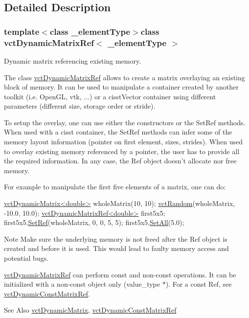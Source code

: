 \subsection{Detailed Description}
\subsubsection*{template$<$class \-\_\-element\-Type$>$class vct\-Dynamic\-Matrix\-Ref$<$ \-\_\-element\-Type $>$}

Dynamic matrix referencing existing memory. 

The class \hyperlink{classvct_dynamic_matrix_ref}{vct\-Dynamic\-Matrix\-Ref} allows to create a matrix overlaying an existing block of memory. It can be used to manipulate a container created by another toolkit (i.\-e. Open\-G\-L, vtk, ...) or a cisst\-Vector container using different parameters (different size, storage order or stride).

To setup the overlay, one can use either the constructors or the Set\-Ref methods. When used with a cisst container, the Set\-Ref methods can infer some of the memory layout information (pointer on first element, sizes, strides). When used to overlay existing memory referenced by a pointer, the user has to provide all the required information. In any case, the Ref object doesn't allocate nor free memory.

For example to manipulate the first five elements of a matrix, one can do\-: 
\begin{DoxyCode}
\hyperlink{classvct_dynamic_matrix}{vctDynamicMatrix<double>} wholeMatrix(10, 10);
\hyperlink{group__cisst_vector_ga0d25660a2dc6ef9c093f6f6b2804d2d0}{vctRandom}(wholeMatrix, -10.0, 10.0);
\hyperlink{classvct_dynamic_matrix_ref}{vctDynamicMatrixRef<double>} first5x5;
first5x5.\hyperlink{classvct_dynamic_matrix_ref_a99a2f5a8b4b5f45ce180d5075dd70311}{SetRef}(wholeMatrix, 0, 0, 5, 5);
first5x5.\hyperlink{classvct_dynamic_matrix_base_ad7e53be82e28a75b78ed3bd8e4923035}{SetAll}(5.0);
\end{DoxyCode}


\begin{DoxyNote}{Note}
Make sure the underlying memory is not freed after the Ref object is created and before it is used. This would lead to faulty memory access and potential bugs.

\hyperlink{classvct_dynamic_matrix_ref}{vct\-Dynamic\-Matrix\-Ref} can perform const and non-\/const operations. It can be initialized with a non-\/const object only ({\ttfamily value\-\_\-type $\ast$}). For a const Ref, see \hyperlink{classvct_dynamic_const_matrix_ref}{vct\-Dynamic\-Const\-Matrix\-Ref}.
\end{DoxyNote}
\begin{DoxySeeAlso}{See Also}
\hyperlink{classvct_dynamic_matrix}{vct\-Dynamic\-Matrix}, \hyperlink{classvct_dynamic_const_matrix_ref}{vct\-Dynamic\-Const\-Matrix\-Ref}
\end{DoxySeeAlso}

